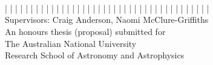 
\begin{titlepage}
  \begin{center}
    \makeatletter
    {\Huge\textbf{\@title}} \\[.4cm]
    {\Huge\textbf{\thesisqualifier}} \\[.4cm]
    {\huge\textbf{\@author}} \\ [.4cm]
    {| | | | | | | | | | | | | | | | | | | | | | | | | | | | | | | | | | | | | | | |} \\[.1cm]
    {\large Supervisors: Craig Anderson, Naomi McClure-Griffiths} \\[7cm]
    \makeatother
    {\large An honours thesis (proposal) submitted for \\
    The Australian National University \\
    Research School of Astronomy and Astrophysics}\\[2cm]
    {\LARGE \thismonth}
  \end{center}
\end{titlepage}
